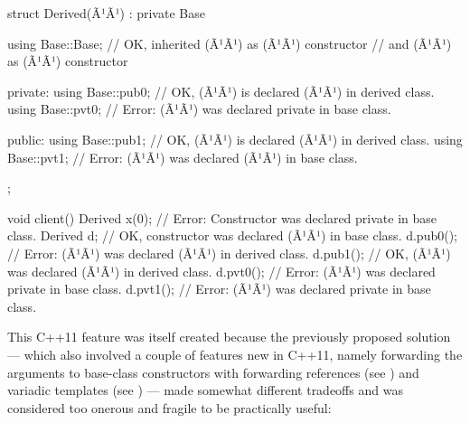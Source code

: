 \begin{emcppslisting}[language=C++]
struct Derived(Ã¹{\footnotemark}Ã¹) : private Base
{
    using Base::Base;  // OK, inherited (Ã¹{}Ã¹) as (Ã¹{}Ã¹) constructor
                       // and (Ã¹{}Ã¹) as (Ã¹{}Ã¹) constructor

private:
    using Base::pub0;  // OK, (Ã¹{}Ã¹) is declared (Ã¹{}Ã¹) in derived class.
    using Base::pvt0;  // Error: (Ã¹{}Ã¹) was declared private in base class.

public:
    using Base::pub1;  // OK, (Ã¹{}Ã¹) is declared (Ã¹{}Ã¹) in derived class.
    using Base::pvt1;  // Error: (Ã¹{}Ã¹) was declared (Ã¹{}Ã¹) in base class.
};

void client()
{
     Derived x(0);  // Error: Constructor was declared private in base class.
     Derived d;     // OK, constructor was declared (Ã¹{}Ã¹) in base class.
     d.pub0();      // Error: (Ã¹{}Ã¹) was declared (Ã¹{}Ã¹) in derived class.
     d.pub1();      // OK, (Ã¹{}Ã¹) was declared (Ã¹{}Ã¹) in derived class.
     d.pvt0();      // Error: (Ã¹{}Ã¹) was declared private in base class.
     d.pvt1();      // Error: (Ã¹{}Ã¹) was declared private in base class.
}
\end{emcppslisting}
{\cprotect{}}
    
\noindent This C++11 feature was itself created because the previously proposed
solution --- which also involved a couple of features new in C++11, namely
forwarding the arguments to base-class constructors with
forwarding references (see ) 
and variadic
templates (see ) 
--- made somewhat different tradeoffs and was
considered too onerous and fragile to be practically useful:

